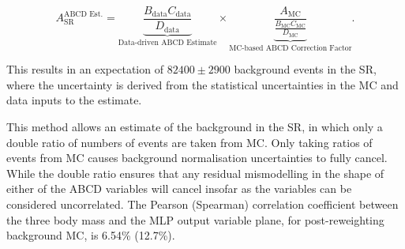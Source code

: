 \documentclass[NOTE, atlasdraft=true, texlive=2017, UKenglish]{\ATLASLATEXPATH atlasdoc}
\begin{document}
$$ A^\text{ABCD Est.}_\text{SR} = \underbrace{\frac{B_\text{data} C_\text{data}}{D_\text{data}}}_\text{Data-driven ABCD Estimate} \times \underbrace{\frac{A_\text{MC}}{\frac{B_\text{MC} C_\text{MC}}{D_\text{MC}}}}_\text{MC-based ABCD Correction Factor} \text{.}$$

\noindent This results in an expectation of $82400 \pm 2900$ background events in the SR, where the uncertainty is derived from the statistical uncertainties in the MC and data inputs to the estimate.

This method allows an estimate of the background in the SR, in which only a double ratio of numbers of events are taken from MC. Only taking ratios of events from MC causes background normalisation uncertainties to fully cancel. While the double ratio ensures that any residual mismodelling in the shape of either of the ABCD variables will cancel insofar as the variables can be considered uncorrelated. The Pearson (Spearman) correlation coefficient between the three body mass and the MLP output variable plane, for post-reweighting background MC, is 6.54\% (12.7\%). %





\end{document}
